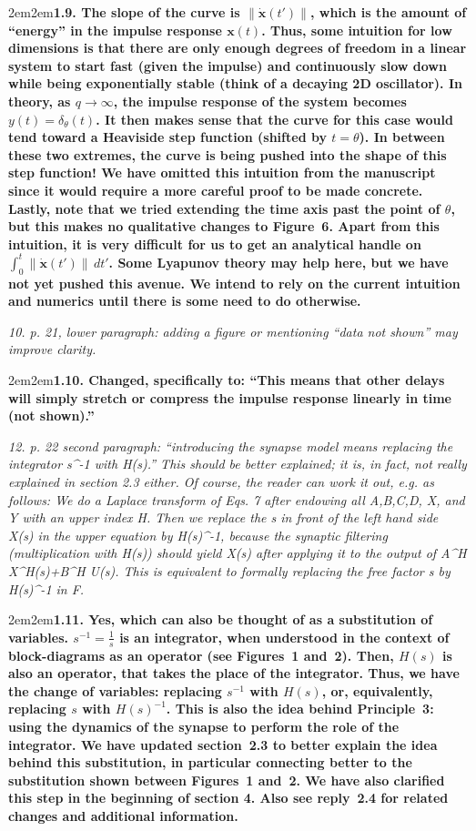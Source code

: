 \documentclass[a4paper]{article}
\newcommand{\newl}{\par\null\par}
\newcommand{\REVIEW}[1]{{\it #1}}
\newcommand{\REPLY}[1]{\newl\begin{adjustwidth}{2em}{2em}{\bf #1}\end{adjustwidth}\newl}
\begin{document}
\REPLY{1.9. The slope of the curve is $\| \dot{\mathbf x}(t') \|$, which is the amount of ``energy'' in the impulse response ${\mathbf x}(t)$.
Thus, some intuition for low dimensions is that there are only enough degrees of freedom in a linear system to start fast (given the impulse) and continuously slow down while being exponentially stable (think of a decaying 2D oscillator).
In theory, as $q \rightarrow \infty$, the impulse response of the system becomes $y(t) = \delta_\theta(t)$.
It then makes sense that the curve for this case would tend toward a Heaviside step function (shifted by $t = \theta$).
In between these two extremes, the curve is being pushed into the shape of this step function!
We have omitted this intuition from the manuscript since it would require a more careful proof to be made concrete.
Lastly, note that we tried extending the time axis past the point of $\theta$, but this makes no qualitative changes to Figure~6.
Apart from this intuition, it is very difficult for us to get an analytical handle on $\int_0^t \| \dot{\mathbf x}(t') \| \, dt'$.
Some Lyapunov theory may help here, but we have not yet pushed this avenue.
We intend to rely on the current intuition and numerics until there is some need to do otherwise.}

\REVIEW{10. p. 21, lower paragraph: adding a figure or mentioning ``data not shown'' may improve clarity.}

\REPLY{1.10. Changed, specifically to: ``This means that other delays will simply stretch or compress the impulse response linearly in time (not shown).''}

\REVIEW{12. p. 22 second paragraph: ``introducing the synapse model means replacing the integrator s\^{}-1 with H(s).'' This should be better explained; it is, in fact, not really explained in section 2.3 either. Of course, the reader can work it out, e.g. as follows: We do a Laplace transform of Eqs. 7 after endowing all A,B,C,D, X, and Y with an upper index H. Then we replace the s in front of the left hand side X(s) in the upper equation by H(s)\^{}-1, because the synaptic filtering (multiplication with H(s)) should yield X(s) after applying it to the output of A\^{}H X\^{}H(s)+B\^{}H U(s). This is equivalent to formally replacing the free factor s by H(s)\^{}-1 in F.}

\REPLY{1.11. Yes, which can also be thought of as a substitution of variables.
$s^{-1} = \frac{1}{s}$ is an integrator, when understood in the context of block-diagrams as an operator (see Figures~1 and~2).
Then, $H(s)$ is also an operator, that takes the place of the integrator.
Thus, we have the change of variables: replacing $s^{-1}$ with $H(s)$, or, equivalently, replacing $s$ with $H(s)^{-1}$.
This is also the idea behind Principle~3: using the dynamics of the synapse to perform the role of the integrator.
We have updated section~2.3 to better explain the idea behind this substitution, in particular connecting better to the substitution shown between Figures~1 and~2.
We have also clarified this step in the beginning of section 4.
Also see reply~2.4 for related changes and additional information.}
\end{document}
